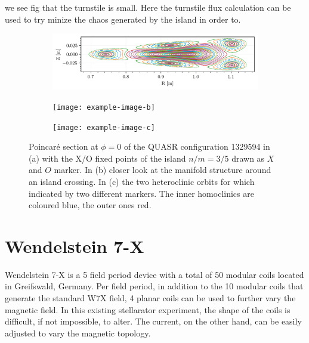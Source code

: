 we see fig that the turnstile is small. Here the turnstile flux calculation can be used to try minize the chaos generated by the island in order to.

\begin{figure}[H]
    \centering
    \begin{subfigure}[t]{\textwidth}
        \centering
        \includegraphics[width=\textwidth]{images/quasrs/poincare_1329594.png}
        \caption{}
        \label{fig:p-1329594}
    \end{subfigure}
    \begin{subfigure}[t]{0.49\textwidth}
        \centering
        \texttt{[image: example-image-b]}
        \caption{}
        \label{fig:manifold-1329594}
    \end{subfigure}
    \hfill
    \begin{subfigure}[t]{0.49\textwidth}
        \centering
        \texttt{[image: example-image-c]}
        \caption{}
        \label{fig:turn-1329594}
    \end{subfigure}
    \caption{Poincaré section at $\phi=0$ of the QUASR configuration 1329594 in (a) with the X/O fixed points of the island $n/m = 3/5$ drawn as $X$ and $O$ marker. In (b) closer look at the manifold structure around an island crossing. In (c) the two heteroclinic orbits for which indicated by two different markers. The inner homoclinics are coloured blue, the outer ones red.}
    \label{fig:pmt-1329594}
\end{figure}

\section{Wendelstein 7-X}\label{sec:w7x}

Wendelstein 7-X is a 5 field period device with a total of 50 modular coils located in Greifswald, Germany. Per field period, in addition to the 10 modular coils that generate the standard W7X field, 4 planar coils can be used to further vary the magnetic field. In this existing stellarator experiment, the shape of the coils is difficult, if not impossible, to alter. The current, on the other hand, can be easily adjusted to vary the magnetic topology.

